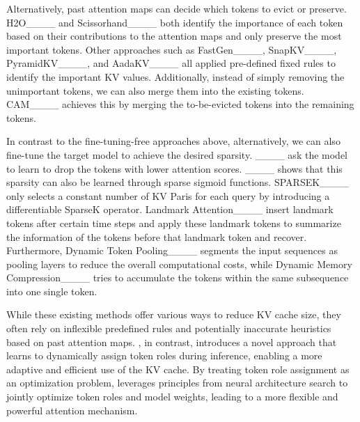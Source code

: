 Alternatively, past attention maps can decide which tokens to evict or preserve. H2O____  and Scissorhand____ both identify the importance of each token based on their contributions to the attention maps and only preserve the most important tokens. Other approaches such as FastGen____, SnapKV____, PyramidKV____, and AadaKV____ all applied pre-defined fixed rules to identify the important KV values. Additionally, instead of simply removing the unimportant tokens, we can also merge them into the existing tokens. CAM____ achieves this by merging the to-be-evicted tokens into the remaining tokens. 

In contrast to the fine-tuning-free approaches above,  alternatively, we can also fine-tune the target model to achieve the desired sparsity. ____ ask the model to learn to drop the tokens with lower attention scores. ____ shows that this sparsity can also be learned through sparse sigmoid functions. SPARSEK____ only selects a constant number of KV Paris for each query by introducing a differentiable SparseK operator. Landmark Attention____ insert landmark tokens after certain time steps and apply these landmark tokens to summarize the information of the tokens before that landmark token and recover. Furthermore, Dynamic Token Pooling____ segments the input sequences as pooling layers to reduce the overall computational costs, while Dynamic Memory Compression____  tries to accumulate the tokens within the same subsequence into one single token. 

While these existing methods offer various ways to reduce KV cache size, they often rely on inflexible predefined rules and potentially inaccurate heuristics based on past attention maps. \ourname, in contrast, introduces a novel approach that learns to dynamically assign token roles during inference, enabling a more adaptive and efficient use of the KV cache. By treating token role assignment as an optimization problem, \ourname{} leverages principles from neural architecture search to jointly optimize token roles and model weights, leading to a more flexible and powerful attention mechanism.

